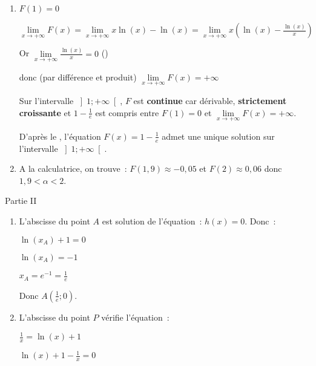 \begin{corrige}
\begin{enumerate}
          \item
          $F\left(1\right)=0$
          \par
          $\lim\limits_{x\rightarrow +\infty }F\left(x\right)=\lim\limits_{x\rightarrow +\infty }x\ln\left(x\right)-\ln\left(x\right)=\lim\limits_{x\rightarrow +\infty }x\left(\ln\left(x\right)-\frac{\ln\left(x\right)}{x}\right)$
          \par
          Or $\lim\limits_{x\rightarrow +\infty }\frac{\ln\left(x\right)}{x}=0$ ()
          \par
          donc (par différence et produit) $\lim\limits_{x\rightarrow +\infty }F\left(x\right)=+\infty $
          \par
          Sur l'intervalle $\left]1;+\infty \right[$, $F$ est \textbf{continue} car dérivable, \textbf{strictement croissante} et  $1-\frac{1}{e}$ est compris entre $F\left(1\right)=0$ et  $\lim\limits_{x\rightarrow +\infty }F\left(x\right)=+\infty $.
          \par
          D'après le ,  l'équation $F\left(x\right)=1-\frac{1}{e}$ admet une unique solution sur l'intervalle $\left]1;+\infty \right[$.
          \item
          A la calculatrice, on trouve : $F\left(1,9\right)\approx -0,05$ et $F\left(2\right)\approx 0,06$ donc $1,9 < \alpha  < 2$.
     \end{enumerate}
     \begin{h3} Partie II \end{h3}
     \begin{enumerate}
          \item
          L'abscisse du point $A$ est solution de l'équation : $h\left(x\right)=0$. Donc :
          \par
          $\ln\left(x_{A}\right)+1=0$
          \par
          $\ln\left(x_{A}\right)=-1$
          \par
          $x_{A}=e^{-1}=\frac{1}{e}$
          \par
          Donc $A\left(\frac{1}{e};0\right)$.
          \item
          L'abscisse du point $P$ vérifie l'équation :
          \par
          $\frac{1}{x}=\ln\left(x\right)+1$
          \par
          $\ln\left(x\right)+1-\frac{1}{x}=0$
          \par

\end{enumerate}
\end{corrige}
